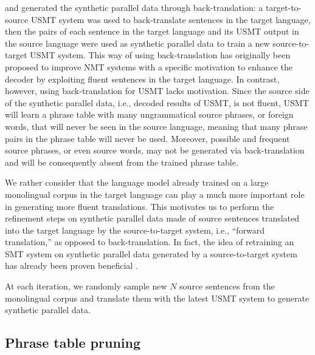 \documentclass[11pt,a4paper]{article}
\begin{document}
\citet{artetxe2018unsupervised} and \citet{DBLP:journals/corr/abs-1804-07755} generated the synthetic parallel data through back-translation: a target-to-source USMT system was used to back-translate sentences in the target language, then the pairs of each sentence in the target language and its USMT output in the source language were used as synthetic parallel data to train a new source-to-target USMT system. This way of using back-translation has originally been proposed to improve NMT systems \citep{sennrich-haddow-birch:2016:P16-11} with a specific motivation to enhance the decoder by exploiting fluent sentences in the target language. In contrast, however, using back-translation for USMT lacks motivation. Since the source side of the synthetic parallel data, i.e., decoded results of USMT, is not fluent, USMT will learn a phrase table with many ungrammatical source phrases, or foreign words, that will never be seen in the source language, meaning that many phrase pairs in the phrase table will never be used. Moreover, possible and frequent source phrases, or even source words, may not be generated via back-translation and will be consequently absent from the trained phrase table.

We rather consider that the language model already trained on a large monolingual corpus in the target language can play a much more important role in generating more fluent translations.
This motivates us to perform the refinement steps on synthetic parallel data made of source sentences translated into the target language by the source-to-target system, i.e., ``forward translation,'' as opposed to back-translation. In fact, the idea of retraining an SMT system on synthetic parallel data generated by a source-to-target system has already been proven beneficial \citep{P07-1004}. 

At each iteration, we randomly sample new $N$ source sentences from the monolingual corpus and translate them with the latest USMT system to generate synthetic parallel data.




\subsection{Phrase table pruning}
\label{section:pruning}
\end{document}
